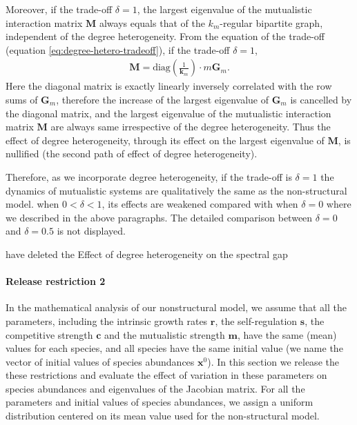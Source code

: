 \documentclass[a4paper,fleqn,12pt]{article}
\begin{document}
Moreover, if the trade-off $\delta = 1$, the largest eigenvalue of the mutualistic interaction matrix $\mathbf{M}$ always equals that of the $k_m$-regular bipartite graph, independent of the degree heterogeneity.
From the equation of the trade-off (equation \ref{eq:degree-hetero-tradeoff}),
if the trade-off $\delta = 1$,
\begin{align}
 \mathbf{M} = \textrm{diag}(\frac{1}{\mathbf{k}_m}) \cdot m\mathbf{G}_m.
\end{align} 
Here the diagonal matrix is exactly linearly inversely correlated with the row sums of $\mathbf{G}_m$,
therefore the increase of the largest eigenvalue of $\mathbf{G}_m$ is cancelled by the diagonal matrix,
and the largest eigenvalue of the mutualistic interaction matrix $\mathbf{M}$ are always same irrespective of the degree heterogeneity. Thus the effect of degree heterogeneity, through its effect on the largest eigenvalue of $\mathbf{M}$, is nullified (the second path of effect of degree heterogeneity).

Therefore, as we incorporate degree heterogeneity, if the trade-off is $\delta = 1$ the dynamics of mutualistic systems are qualitatively the same as the non-structural model. 
when $0 < \delta < 1$, its effects are weakened compared with when $\delta = 0$ where we described in the above paragraphs.
The detailed comparison between $\delta = 0$ and $\delta = 0.5$ is not displayed. 

{\color{red} have deleted the Effect of degree heterogeneity on the spectral gap}

\paragraph*{Release restriction 2}
In the mathematical analysis of our nonstructural model, 
we assume that all the parameters, including the intrinsic growth rates $\mathbf{r}$, the self-regulation $\mathbf{s}$, the competitive strength $\mathbf{c}$ and the mutualistic strength $\mathbf{m}$, have the same (mean) values for each species,
and all species have the same initial value (we name the vector of initial values of species abundances $\mathbf{x}^0$).
In this section we release the these restrictions and evaluate the effect of variation in these parameters on species abundances and eigenvalues of the Jacobian matrix.
For all the parameters and initial values of species abundances,
we assign a uniform distribution centered on its mean value used for the non-structural model.
\end{document}
